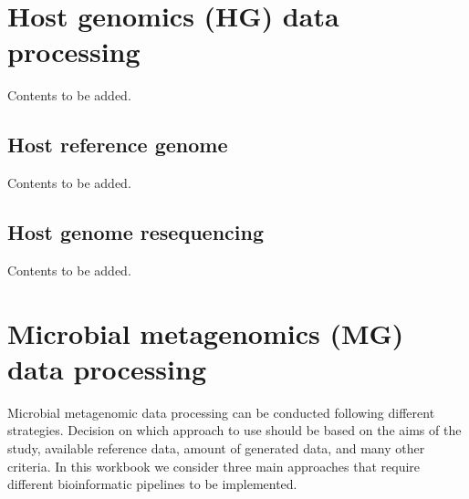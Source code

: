 \documentclass[
]{book}
\begin{document}
\hypertarget{host-genomics-data-processing}{%
\chapter{Host genomics (HG) data processing}\label{host-genomics-data-processing}}

Contents to be added.

\hypertarget{host-reference-genome}{%
\section{Host reference genome}\label{host-reference-genome}}

Contents to be added.

\hypertarget{host-genome-resequencing}{%
\section{Host genome resequencing}\label{host-genome-resequencing}}

Contents to be added.

\hypertarget{microbial-metagenomics-data-processing}{%
\chapter{Microbial metagenomics (MG) data processing}\label{microbial-metagenomics-data-processing}}

Microbial metagenomic data processing can be conducted following different strategies. Decision on which approach to use should be based on the aims of the study, available reference data, amount of generated data, and many other criteria. In this workbook we consider three main approaches that require different bioinformatic pipelines to be implemented.
\end{document}
